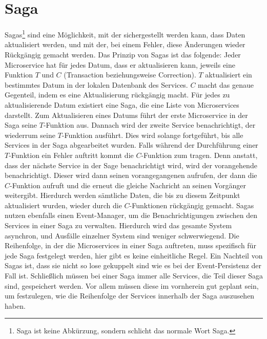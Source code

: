 \section{Saga}
Sagas\footnote{Saga ist keine Abkürzung, sondern schlicht das normale Wort \glqq Saga\grqq.} sind eine Möglichkeit, mit der sichergestellt werden kann, dass Daten aktualisiert werden, und mit der, bei einem Fehler, diese Änderungen wieder Rückgängig gemacht werden.
Das Prinzip von Sagas ist das folgende:
Jeder Microservice hat für jedes Datum, dass er aktualisieren kann, jeweils eine Funktion $T$ und $C$ (Transaction beziehungsweise Correction). $T$ aktualisiert ein bestimmtes Datum in der lokalen Datenbank des Services. $C$ macht das genaue Gegenteil, indem es eine Aktualisierung rückgängig macht. Für jedes zu aktualisierende Datum existiert eine Saga, die eine Liste von Microservices darstellt. Zum Aktualisieren eines Datums führt der erste Microservice in der Saga seine $T$-Funktion aus. Dannach wird der zweite Service benachrichtigt, der wiederrum seine $T$-Funktion ausführt. Dies wird solange fortgeführt, bis alle Services in der Saga abgearbeitet wurden. Falls während der Durchführung einer $T$-Funktion ein Fehler auftritt kommt die $C$-Funktion zum tragen. Denn anstatt, dass der nächste Service in der Sage benachrichtigt wird, wird der vorangehende benachrichtigt. Dieser wird dann seinen vorangegangenen aufrufen, der dann die $C$-Funktion aufruft und die erneut die gleiche Nachricht an seinen Vorgänger weitergibt. Hierdurch werden sämtliche Daten, die bis zu diesem Zeitpunkt aktualisiert wurden, wieder durch die $C$-Funktionen rückgängig gemacht.
Sagas nutzen ebenfalls einen Event-Manager, um die Benachrichtigungen zwischen den Services in einer Saga zu verwalten. Hierdurch wird das gesamte System asynchron, und Ausfälle einzelner System sind weniger schwerwiegend.
Die Reihenfolge, in der die Microservices in einer Saga auftreten, muss spezifisch für jede Saga festgelegt werden, hier gibt es keine einheitliche Regel.
Ein Nachteil von Sagas ist, dass sie nicht so lose gekuppelt sind wie es bei der Event-Persistenz der Fall ist. Schließlich müssen bei einer Saga immer alle Services, die Teil dieser Saga sind, gespeichert werden. Vor allem müssen diese im vornherein gut geplant sein, um festzulegen, wie die Reihenfolge der Services innerhalb der Saga auszusehen haben.
